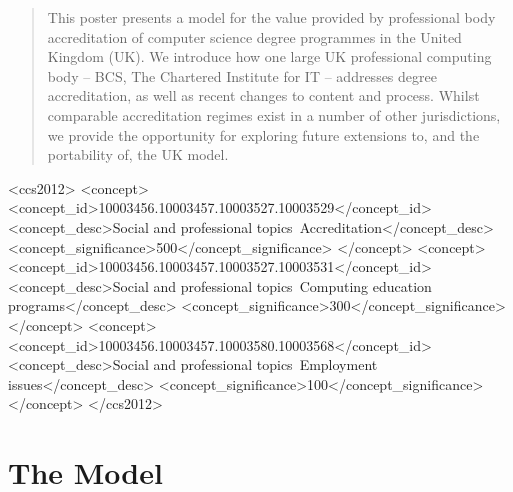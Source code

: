 \documentclass[sigconf]{acmart}
\begin{document}
%
\begin{abstract}
This poster presents a model for the value provided by professional
body accreditation of computer science degree programmes in the United
Kingdom (UK). We introduce how one large UK professional computing
body -- BCS, The Chartered Institute for IT -- addresses degree
accreditation, as well as recent changes to content and process. Whilst
comparable accreditation regimes exist in a number of other
jurisdictions, we provide the opportunity for exploring future
extensions to, and the portability of, the UK model.

\end{abstract}

%
%
\begin{CCSXML}
	<ccs2012>
	<concept>
	<concept_id>10003456.10003457.10003527.10003529</concept_id>
	<concept_desc>Social and professional topics~Accreditation</concept_desc>
	<concept_significance>500</concept_significance>
	</concept>
	<concept>
	<concept_id>10003456.10003457.10003527.10003531</concept_id>
	<concept_desc>Social and professional topics~Computing education programs</concept_desc>
	<concept_significance>300</concept_significance>
	</concept>
	<concept>
	<concept_id>10003456.10003457.10003580.10003568</concept_id>
	<concept_desc>Social and professional topics~Employment issues</concept_desc>
	<concept_significance>100</concept_significance>
	</concept>
	</ccs2012>
\end{CCSXML}




%
\maketitle

\section*{The Model}
\end{document}
